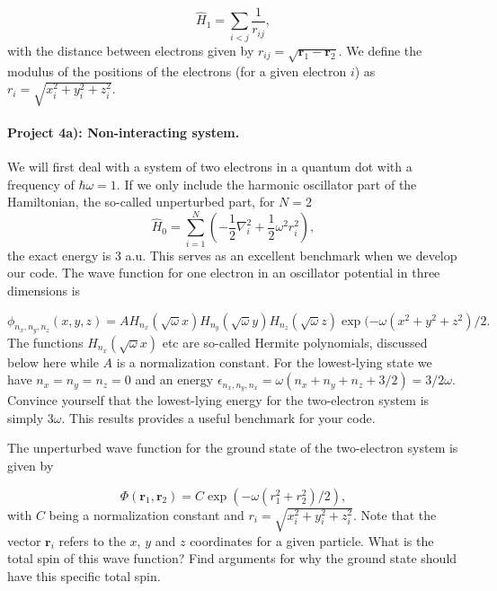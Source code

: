 \documentclass[%
oneside,                 %
final,                   %
10pt]{article}
\begin{document}
\begin{equation*}
\hat{H}_1=\sum_{i<j}\frac{1}{r_{ij}},
\end{equation*}
with the distance between electrons given by $r_{ij}=\sqrt{\mathbf{r}_1-\mathbf{r}_2}$. We define the
modulus of the positions of the electrons (for a given electron $i$) as $r_i = \sqrt{x_i^2+y_i^2+z_i^2}$.



\paragraph{Project 4a): Non-interacting system.}
We will first deal with a system of
  two electrons in a quantum dot with a frequency of $\hbar\omega = 1$.
  If we only include  the harmonic oscillator part of the Hamiltonian,
  the so-called unperturbed part,  for $N=2$
\begin{equation*} \hat{H}_0=\sum_{i=1}^{N} \left(  -\frac{1}{2} \nabla_i^2 + \frac{1}{2} \omega^2r_i^2  \right),\end{equation*}
  the exact energy is $3$ a.u.  This serves as an excellent benchmark when we develop our code.
  The wave function for one electron in an oscillator potential in three dimensions is

\begin{equation*}
  \phi_{n_x,n_y,n_z}(x,y,z) = A H_{n_x}(\sqrt{\omega}x)H_{n_y}(\sqrt{\omega}y)H_{n_z}(\sqrt{\omega}z)\exp{(-\omega(x^2+y^2+z^2)/2}.
  \end{equation*}
  The functions $H_{n_x}(\sqrt{\omega}x)$ etc are so-called Hermite polynomials, discussed below  here while $A$ is a normalization constant.
  For the lowest-lying state we have $n_x=n_y=n_z=0$ and an energy $\epsilon_{n_x,n_y,n_x}=\omega(n_x+n_y+n_z+3/2) = 3/2\omega$.
  Convince yourself that the lowest-lying energy for the two-electron system  is simply $3\omega$. This results provides a useful benchmark for your code.

  The unperturbed wave function for the ground state of the two-electron system is given by

\begin{equation*}
  \Phi(\mathbf{r}_1,\mathbf{r}_2) = C\exp{\left(-\omega(r_1^2+r_2^2)/2\right)},
  \end{equation*}
  with $C$ being a normalization constant and $r_i = \sqrt{x_i^2+y_i^2+z_i^2}$. Note that the vector $\mathbf{r}_i$
  refers to the $x$, $y$ and $z$ coordinates for a given particle.
  What is the total spin of this wave function? Find arguments for why the ground state should have
  this specific total spin.
\end{document}
